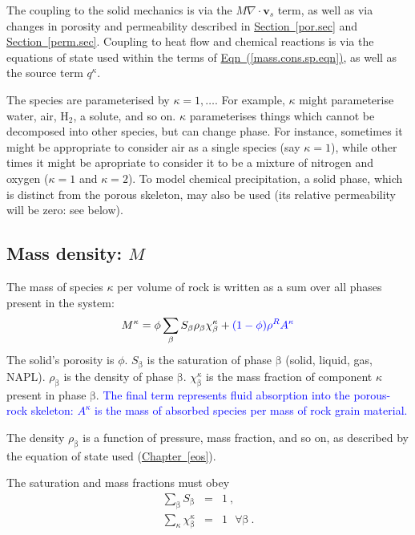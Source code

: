 \documentclass[12pt]{report}
\def\species{\kappa}
\def\phase{\mathrm{\beta}}
\def\massfrac{\chi}
\begin{document}
The coupling to the solid mechanics is via the $M\nabla\cdot {\mathbf
  v}_{s}$ term, as well as via changes in porosity and permeability
described in \hyperref[por.sec]{Section~\ref*{por.sec}} and
\hyperref[perm.sec]{Section~\ref*{perm.sec}}.  Coupling to heat flow
and chemical reactions is via the equations of state used within the
terms of \hyperref[mass.cons.sp.eqn]{Eqn~(\ref*{mass.cons.sp.eqn})},
as well as the source term $q^{\species}$.

The species are parameterised by $\species = 1,\ldots$.  For example,
$\species$ might parameterise water, air, H$_{2}$, a solute, and so
on.  $\species$ parameterises things which cannot be decomposed into
other species, but can change phase.  For instance, sometimes it might
be appropriate to consider air as a single species (say $\species=1$),
while other times it might be apropriate to consider it to be a
mixture of nitrogen and oxygen ($\species=1$ and $\species=2$).  To
model chemical precipitation, a solid phase, which is distinct from
the porous skeleton, may also be used (its relative permeability will
be zero: see below).

\subsection{Mass density: $M$}

The mass of species $\species$ per volume of rock is written as a sum
over all phases present in the system:
\begin{equation}
M^{\species} =
\phi\sum_{\phase}S_{\phase}\rho_{\phase}\massfrac_{\phase}^{\species}
+ \textcolor{blue}{(1 - \phi)\rho^{R}A^{\species}}
\label{eqn.msph}
\end{equation}
The solid's porosity is $\phi$.  $S_{\phase}$ is the saturation of
phase $\phase$ (solid, liquid, gas, NAPL).  $\rho_{\phase}$ is the density of
phase $\phase$.  $\massfrac_{\phase}^{\species}$ is the mass fraction
of component $\species$ present in phase $\phase$.  \textcolor{blue}{The final term
represents fluid absorption into the porous-rock skeleton:
$A^{\species}$ is the mass of absorbed species per mass of rock grain
material.}

The density $\rho_{\phase}$ is a function of pressure, mass fraction,
and so on, as described by the equation of state used
(\hyperref[eos]{Chapter~\ref*{eos}}).

The saturation and mass fractions must obey
\begin{eqnarray}
\sum_{\phase}S_{\phase} & = & 1 \ , \\
\sum_{\species}\massfrac_{\phase}^{\species} & = & 1 \ \ \ \forall
\phase \ .
\end{eqnarray}
\end{document}
